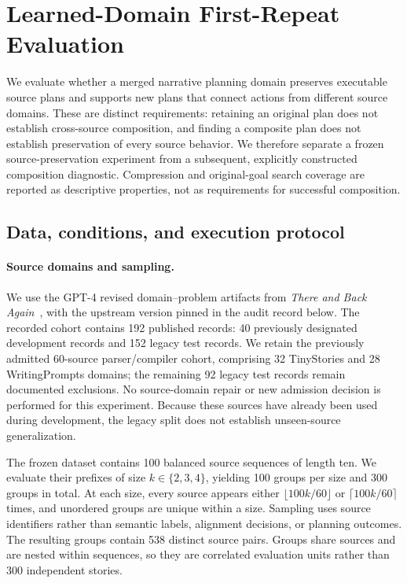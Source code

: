 \section{Learned-Domain First-Repeat Evaluation}
\label{sec:supp-repeat-one-evaluation}

We evaluate whether a merged narrative planning domain preserves executable source plans and supports new plans that connect actions from different source domains. These are distinct requirements: retaining an original plan does not establish cross-source composition, and finding a composite plan does not establish preservation of every source behavior. We therefore separate a frozen source-preservation experiment from a subsequent, explicitly constructed composition diagnostic. Compression and original-goal search coverage are reported as descriptive properties, not as requirements for successful composition.

\subsection{Data, conditions, and execution protocol}

\paragraph{Source domains and sampling.}
We use the GPT-4 revised domain--problem artifacts from \emph{There and Back Again}~\cite{kelly2023there}, with the upstream version pinned in the audit record below. The recorded cohort contains 192 published records: 40 previously designated development records and 152 legacy test records. We retain the previously admitted 60-source parser/compiler cohort, comprising 32 TinyStories and 28 WritingPrompts domains; the remaining 92 legacy test records remain documented exclusions. No source-domain repair or new admission decision is performed for this experiment. Because these sources have already been used during development, the legacy split does not establish unseen-source generalization.

The frozen dataset contains 100 balanced source sequences of length ten. We evaluate their prefixes of size $k\in\{2,3,4\}$, yielding 100 groups per size and 300 groups in total. At each size, every source appears either $\lfloor100k/60\rfloor$ or $\lceil100k/60\rceil$ times, and unordered groups are unique within a size. Sampling uses source identifiers rather than semantic labels, alignment decisions, or planning outcomes. The resulting groups contain 538 distinct source pairs. Groups share sources and are nested within sequences, so they are correlated evaluation units rather than 300 independent stories.

